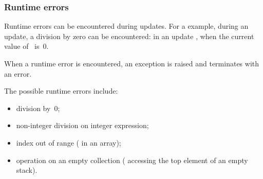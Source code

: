 %
%
%
%
%
%
%


\subsubsection{Runtime errors}\label{ss:runtime-errors}

Runtime errors can be encountered during updates.
For a example, during an update, a division by zero can be encountered: \eg{} in an update , when the current value of~ is~0.

When a runtime error is encountered, an exception is raised and \imitator{} terminates with an error.

The possible runtime errors include:
\begin{itemize}
	\item division by~0;
	\item non-integer division on integer expression;
	\item index out of range (\eg{} in an array);
	\item operation on an empty collection (\eg{} accessing the top element of an empty stack).
\end{itemize}


